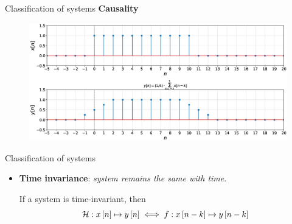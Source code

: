 \documentclass[aspectratio=169]{beamer}
\let\olditem\item
\renewcommand{\item}{\setlength{\itemsep}{\fill}\olditem}
\def\ls{\ensuremath\left[}
\def\rs{\ensuremath\right]}
\begin{document}
\begin{frame}[t]{Classification of systems}
\textbf{Causality}

\begin{figure}
\includegraphics[width=\textwidth]{img/non-causal.eps}
\end{figure}
\end{frame}

\begin{frame}[t]{Classification of systems}

\begin{itemize}
\item \textbf{Time invariance}: \textit{system remains the same with time}.

If a system is time-invariant, then
\[ \mathcal{H}: x\ls n\rs \mapsto y\ls n\rs \iff f:x\ls n-k\rs \mapsto y\ls n-k\rs \]

\end{itemize}
\end{frame}
\end{document}
